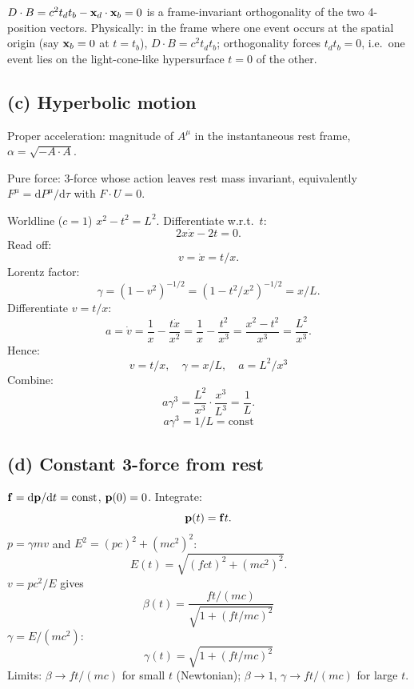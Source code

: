 \documentclass[11pt]{article}
\newcommand{\de}{\mathrm{d}}
\begin{document}
$D\cdot B = c^2 t_d t_b - \vb x_d\cdot\vb x_b = 0$ is a frame-invariant orthogonality of the two 4-position vectors. Physically: in the frame where one event occurs at the spatial origin (say $\vb x_b=0$ at $t=t_b$), $D\cdot B = c^2 t_d t_b$; orthogonality forces $t_d t_b = 0$, i.e.\ one event lies on the light-cone-like hypersurface $t=0$ of the other.

\subsection*{(c) Hyperbolic motion}

Proper acceleration: magnitude of $A^\mu$ in the instantaneous rest frame, $\alpha = \sqrt{-A\cdot A}$.

Pure force: 3-force whose action leaves rest mass invariant, equivalently $F^\mu = \de P^\mu/\de\tau$ with $F\cdot U = 0$.

Worldline ($c=1$) $x^2 - t^2 = L^2$. Differentiate w.r.t.\ $t$:
\[ 2x\dot x - 2t = 0. \]
Read off:
\[ v = \dot x = t/x. \]
Lorentz factor:
\[ \gamma = (1-v^2)^{-1/2} = (1 - t^2/x^2)^{-1/2} = x/L. \]
Differentiate $v = t/x$:
\[ a = \dot v = \frac{1}{x} - \frac{t\dot x}{x^2} = \frac{1}{x} - \frac{t^2}{x^3} = \frac{x^2-t^2}{x^3} = \frac{L^2}{x^3}. \]
Hence:
\[ \boxed{\;v = t/x,\quad \gamma = x/L,\quad a = L^2/x^3\;} \]
Combine:
\[ a\gamma^3 = \frac{L^2}{x^3}\cdot\frac{x^3}{L^3} = \frac{1}{L}. \]
\[ \boxed{\;a\gamma^3 = 1/L = \text{const}\;} \]

\subsection*{(d) Constant 3-force from rest}

$\vb f = \de\vb p/\de t = \text{const}$, $\vb p(0)=0$. Integrate:
\[ \vb p(t) = \vb f t. \]
$p = \gamma m v$ and $E^2 = (pc)^2 + (mc^2)^2$:
\[ E(t) = \sqrt{(fct)^2 + (mc^2)^2}. \]
$v = pc^2/E$ gives
\[ \boxed{\;\beta(t) = \frac{ft/(mc)}{\sqrt{1+(ft/mc)^2}}\;} \]
$\gamma = E/(mc^2)$:
\[ \boxed{\;\gamma(t) = \sqrt{1 + (ft/mc)^2}\;} \]
Limits: $\beta\to ft/(mc)$ for small $t$ (Newtonian); $\beta\to 1$, $\gamma\to ft/(mc)$ for large $t$.

\begin{center}
\end{center}
\end{document}

